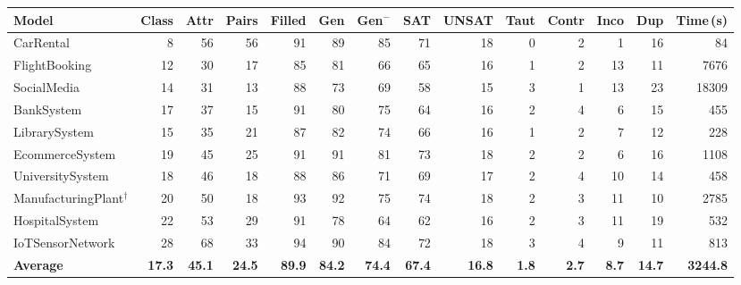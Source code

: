 \begin{table}[t]
\centering
\scriptsize
\setlength{\tabcolsep}{2pt}
\begin{tabular}{l rrr rrr rr rrrr r}
\toprule
\textbf{Model} & \textbf{Class} & \textbf{Attr} & \textbf{Pairs} & \textbf{Filled} & \textbf{Gen} & \textbf{Gen$^{-}$} & \textbf{SAT} & \textbf{UNSAT} & \textbf{Taut} & \textbf{Contr} & \textbf{Inco} & \textbf{Dup} & \textbf{Time\,(s)} \\
\midrule
CarRental                      &     8 &    56 &    56 &    91 &    89 &    85 &    71 &    18 &     0 &     2 &     1 &    16 &    84 \\
FlightBooking                  &    12 &    30 &    17 &    85 &    81 &    66 &    65 &    16 &     1 &     2 &    13 &    11 &  7676 \\
SocialMedia                    &    14 &    31 &    13 &    88 &    73 &    69 &    58 &    15 &     3 &     1 &    13 &    23 & 18309 \\
BankSystem                     &    17 &    37 &    15 &    91 &    80 &    75 &    64 &    16 &     2 &     4 &     6 &    15 &   455 \\
LibrarySystem                  &    15 &    35 &    21 &    87 &    82 &    74 &    66 &    16 &     1 &     2 &     7 &    12 &   228 \\
EcommerceSystem                &    19 &    45 &    25 &    91 &    91 &    81 &    73 &    18 &     2 &     2 &     6 &    16 &  1108 \\
UniversitySystem               &    18 &    46 &    18 &    88 &    86 &    71 &    69 &    17 &     2 &     4 &    10 &    14 &   458 \\
ManufacturingPlant$^{\dagger}$ &    20 &    50 &    18 &    93 &    92 &    75 &    74 &    18 &     2 &     3 &    11 &    10 &  2785 \\
HospitalSystem                 &    22 &    53 &    29 &    91 &    78 &    64 &    62 &    16 &     2 &     3 &    11 &    19 &   532 \\
IoTSensorNetwork               &    28 &    68 &    33 &    94 &    90 &    84 &    72 &    18 &     3 &     4 &     9 &    11 &   813 \\
\midrule
\textbf{Average} & \textbf{17.3} & \textbf{45.1} & \textbf{24.5} & \textbf{89.9} & \textbf{84.2} & \textbf{74.4} & \textbf{67.4} & \textbf{16.8} & \textbf{1.8} & \textbf{2.7} & \textbf{8.7} & \textbf{14.7} & \textbf{3244.8} \\
\bottomrule
\end{tabular}

\end{table}
